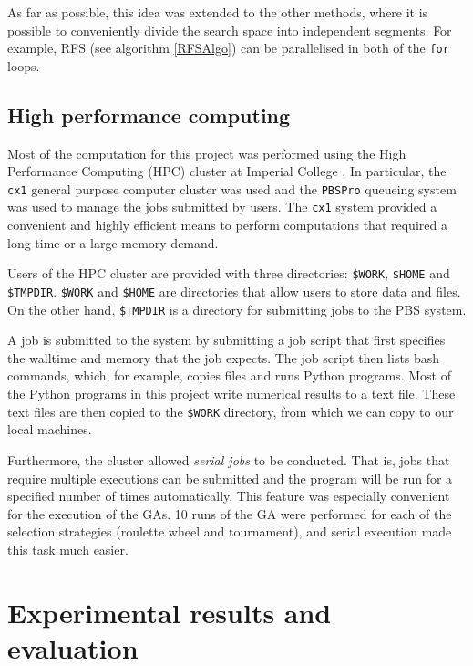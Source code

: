 \documentclass[12pt, twoside, a4paper]{report}
\begin{document}
As far as possible, this idea was extended to the other methods, where it is possible to conveniently divide the search space into independent segments. For example, RFS (see algorithm \ref{RFSAlgo}) can be parallelised in both of the \texttt{for} loops.

\section{High performance computing} \label{hpc}

Most of the computation for this project was performed using the High Performance Computing (HPC) cluster at Imperial College \cite{RefWorks:218}. In particular, the \texttt{cx1} general purpose computer cluster was used and the \texttt{PBSPro} queueing system was used to manage the jobs submitted by users. The \texttt{cx1} system provided a convenient and highly efficient means to perform computations that required a long time or a large memory demand.

Users of the HPC cluster are provided with three directories: \texttt{\$WORK}, \texttt{\$HOME} and \texttt{\$TMPDIR}. \texttt{\$WORK} and \texttt{\$HOME} are directories that allow users to store data and files. On the other hand, \texttt{\$TMPDIR} is a directory for submitting jobs to the PBS system.

A job is submitted to the system by submitting a job script that first specifies the walltime and memory that the job expects. The job script then lists bash commands, which, for example, copies files and runs Python programs. Most of the Python programs in this project write numerical results to a text file. These text files are then copied to the \texttt{\$WORK} directory, from which we can copy to our local machines.

Furthermore, the cluster allowed \textit{serial jobs} to be conducted. That is, jobs that require multiple executions can be submitted and the program will be run for a specified number of times automatically. This feature was especially convenient for the execution of the GAs. 10 runs of the GA were performed for each of the selection strategies (roulette wheel and tournament), and serial execution made this task much easier.


\chapter{Experimental results and evaluation}
\label{evaluation}
\end{document}
